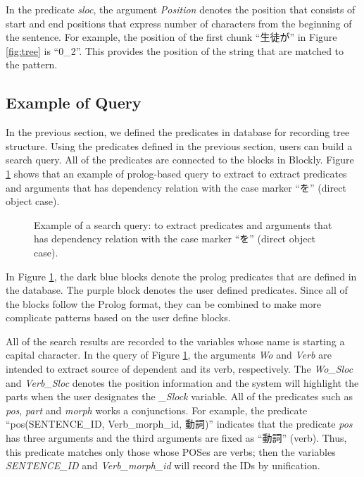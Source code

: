 \documentclass[conference]{IEEEtran}
\begin{document}
In the predicate {\it sloc}, the argument {\it Position} denotes
the position that consists of start and end positions that express number of characters
from the beginning of the sentence.
For example, the position of the first chunk ``生徒が'' in Figure \ref{fig:tree}
is ``0\_2''. This provides the position of the string that are matched to the pattern.



\subsection{Example of Query}
\label{sec:example}
In the previous section, we defined the predicates in database for recording tree structure.
Using the predicates defined in the previous section, 
users can build a search query. All of the predicates are connected to the blocks
in Blockly. Figure \ref{fig:pattern} shows that an example of prolog-based query to extract
to extract predicates and arguments that has dependency relation with the case marker ``を''
(direct object case).

\begin{figure}[htbp]
\caption{Example of a search query: to extract predicates and arguments that has dependency relation with the case marker ``を'' (direct object case).}
\label{fig:pattern}
\end{figure}

In Figure \ref{fig:pattern}, the dark blue blocks denote the prolog predicates that are defined
in the database. The purple block denotes the user defined predicates. Since all of the blocks
follow the Prolog format, they can be combined to make more complicate patterns based on the user define blocks.

All of the search results are recorded to the variables whose name is starting a capital character.
In the query of Figure \ref{fig:pattern}, the arguments {\it Wo} and {\it Verb} are intended
to extract source of dependent and its verb, respectively.
The {\it Wo\_Sloc} and {\it Verb\_Sloc} denotes the position information and the system
will highlight the parts when the user designates the {\it \_Slock} variable. 
All of the predicates such as {\it pos}, {\it part} and {\it morph} works a conjunctions.
For example, the predicate ``pos(SENTENCE\_ID, Verb\_morph\_id, 動詞)'' indicates that
the predicate {\it pos} has three arguments and the third arguments are fixed as ``動詞'' (verb).
Thus, this predicate matches only those whose POSes are verbs; then the variables
{\it SENTENCE\_ID} and {\it Verb\_morph\_id} will record the IDs by unification. 
\end{document}

